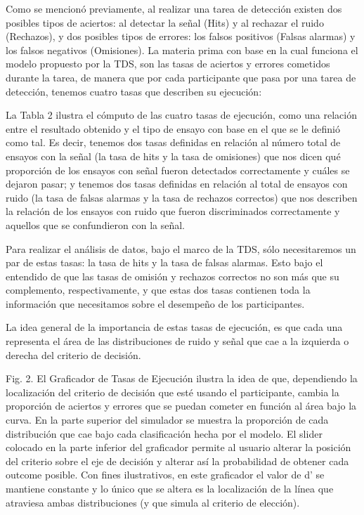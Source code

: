 Como se mencionó previamente, al realizar una tarea de detección existen dos posibles tipos de aciertos: al detectar la señal (Hits) y al rechazar el ruido (Rechazos), y dos posibles tipos de errores: los falsos positivos (Falsas alarmas) y los falsos negativos (Omisiones). La materia prima con base en la cual funciona el modelo propuesto por la TDS, son las tasas de aciertos y errores cometidos durante la tarea, de manera que por cada participante que pasa por una tarea de detección, tenemos cuatro tasas que describen su ejecución:

La Tabla 2 ilustra el cómputo de las cuatro tasas de ejecución, como una relación entre el resultado obtenido y el tipo de ensayo con base en el que se le definió como tal. Es decir, tenemos dos tasas definidas en relación al número total de ensayos con la señal (la tasa de hits y la tasa de omisiones) que nos dicen qué proporción de los ensayos con señal fueron detectados correctamente y cuáles se dejaron pasar; y tenemos dos tasas definidas en relación al total de ensayos con ruido (la tasa de falsas alarmas y la tasa de rechazos correctos) que nos describen la relación de los ensayos con ruido que fueron discriminados correctamente y aquellos que se confundieron con la señal.

Para realizar el análisis de datos, bajo el marco de la TDS, sólo necesitaremos un par de estas tasas: la tasa de hits y la tasa de falsas alarmas. Esto bajo el entendido de que las tasas de omisión y rechazos correctos no son más que su complemento, respectivamente, y que estas dos tasas contienen toda la información que necesitamos sobre el desempeño de los participantes.

La idea general de la importancia de estas tasas de ejecución, es que cada una representa el área de las distribuciones de ruido y señal que cae a la izquierda o derecha del criterio de decisión.

Fig. 2. El Graficador de Tasas de Ejecución ilustra la idea de que, dependiendo la localización del criterio de decisión que esté usando el participante, cambia la proporción de aciertos y errores que se puedan cometer en función al área bajo la curva. En la parte superior del simulador se muestra la proporción de cada distribución que cae bajo cada clasificación hecha por el modelo. El slider colocado en la parte inferior del graficador permite al usuario alterar la posición del criterio sobre el eje de decisión y alterar así la probabilidad de obtener cada outcome posible.  Con fines ilustrativos, en este graficador el valor de d’ se mantiene constante y lo único que se altera es la localización de la línea que atraviesa ambas distribuciones (y que simula al criterio de elección).

